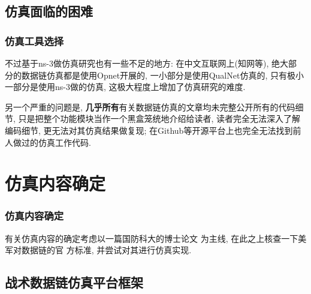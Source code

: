 \documentclass[10pt,mathserif]{beamer}%
\begin{document}
\subsection{仿真面临的困难}
\begin{frame}[fragile]
	\frametitle{仿真工具选择}
	\setlength{\parindent}{2em}
	\begin{spacing}{1.5}
		不过基于ns-3做仿真研究也有一些不足的地方: 在中文互联网上(知网等), 绝大部
		分的数据链仿真都是使用Opnet开展的, 一小部分是使用QualNet仿真的, 只有极小
		一部分是使用ns-3做的仿真, 这极大程度上增加了仿真研究的难度.

		另一个严重的问题是, \textbf{几乎所有}有关数据链仿真的文章均未完整公开所有的代码细
		节, 只是把整个功能模块当作一个黑盒笼统地介绍给读者, 读者完全无法深入了解
		编码细节, 更无法对其仿真结果做复现; 在Github等开源平台上也完全无法找到前
		人做过的仿真工作代码.
	\end{spacing}
\end{frame}


\section{仿真内容确定}

\begin{frame}[fragile]
	\frametitle{仿真内容确定}
	\setlength{\parindent}{2em}
	\begin{spacing}{1.5}
		有关仿真内容的确定考虑以一篇国防科大的博士论文
		\cite{zhanshushujulianzuwang}为主线, 在此之上核查一下美军对数据链的官
		方标准, 并尝试对其进行仿真实现.
	\end{spacing}
\end{frame}


\subsection{战术数据链仿真平台框架}
\end{document}
